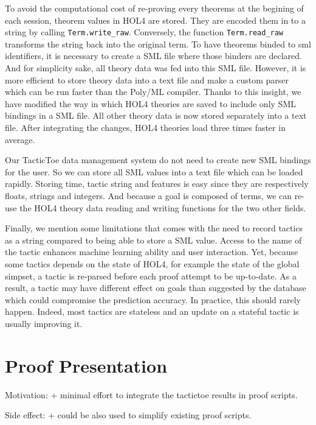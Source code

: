 \documentclass[runningheads,a4paper,draft]{svjour3}
\def\holfour{\textsf{HOL4}\xspace}
\def\sml{\textsf{SML}\xspace}
\def\polyml{\textsf{Poly/ML}\xspace}
\def\tactictoe{\textsf{TacticToe}\xspace}
\begin{document}
To avoid the computational cost of re-proving every theorems at the begining of 
each session, theorem values in \holfour are stored.
They are encoded them in to a string by calling \texttt{Term.write\_raw}.
Conversely, the function \texttt{Term.read\_raw} transforms the string back 
into the original term.
To have theorems binded to sml identifiers, it is necessary to create a 
\sml file where those binders are declared. And for simplicity sake, all theory 
data was fed into this \sml file. However, it is
more efficient to store theory data into a text file and make a custom 
parser which can be run faster than the \polyml compiler.
Thanks to this insight, we have 
modified the way in which \holfour theories are saved to include only \sml 
bindings in a \sml file. All other theory data is now stored separately 
into a text file. After integrating the changes, \holfour theories load three 
times faster in average.

Our \tactictoe data management system do not need to create new \sml
bindings for the user. So we can store all \sml values into a text file which 
can be loaded rapidly.
Storing time, tactic string and features is easy since they are respectively 
floats, strings and integers. And because a goal is composed of terms, we can 
re-use the \holfour theory data reading and writing functions 
for the two other fields.

Finally, we mention some limitations that comes with 
the need to record tactics as a string compared to being able to store a \sml 
value. Access to the name of the tactic enhances machine 
learning ability and user interaction. Yet, because some tactics 
depends on the state of \holfour, for example the state of the global 
simpset, a tactic is re-parsed before each proof attempt to be up-to-date.
As a result, a tactic may have different effect on goals than suggested by the 
database which could compromise the prediction accuracy. In practice, this 
should rarely happen. Indeed, most tactics are stateless and an update on a 
stateful tactic is usually improving it.

\section{Proof Presentation}\label{sec:proofdisplay}

Motivation: 
+ minimal effort to integrate the tactictoe results in proof scripts.

Side effect:
+ could be also used to simplify existing proof scripts. 
\end{document}
